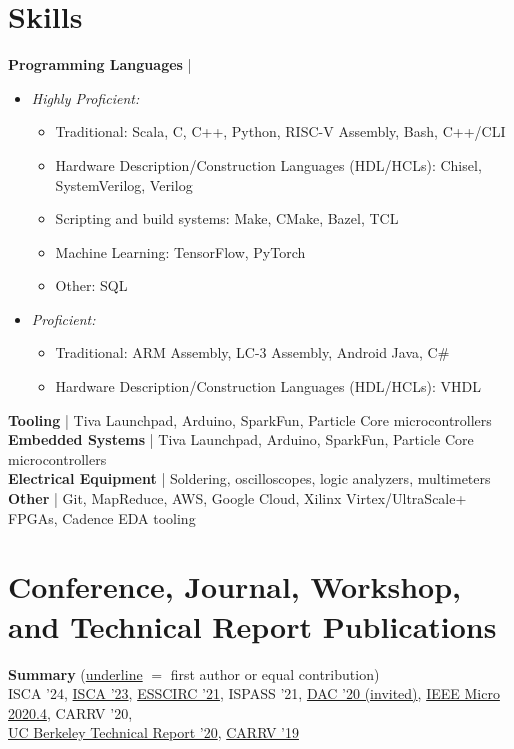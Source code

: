 \documentclass[line]{res}
\begin{document}
\begin{resume}
\pagebreak

\section{\Large{Skills}}
\label{sec:skills}
\vspace{2mm}

\textbf{Programming Languages} |
\begin{itemize}
\item \textit{Highly Proficient:}
\begin{itemize}
\item Traditional: Scala, C, C++, Python, RISC-V Assembly, Bash, C++/CLI
\item Hardware Description/Construction Languages (HDL/HCLs): Chisel, SystemVerilog, Verilog
\item Scripting and build systems: Make, CMake, Bazel, TCL
\item Machine Learning: TensorFlow, PyTorch
\item Other: SQL
\end{itemize}
\item \textit{Proficient:}
\begin{itemize}
\item Traditional: ARM Assembly, LC-3 Assembly, Android Java, C\#
\item Hardware Description/Construction Languages (HDL/HCLs): VHDL
\end{itemize}
\end{itemize}
\vspace{-4mm}
\textbf{Tooling} | Tiva Launchpad, Arduino, SparkFun, Particle Core microcontrollers
\\
\textbf{Embedded Systems} | Tiva Launchpad, Arduino, SparkFun, Particle Core microcontrollers
\\
\textbf{Electrical Equipment} | Soldering, oscilloscopes, logic analyzers, multimeters
\\
\textbf{Other} | Git, MapReduce, AWS, Google Cloud, Xilinx Virtex/UltraScale+ FPGAs, Cadence EDA tooling

\section{\Large{Conference, Journal, Workshop, and Technical Report Publications}}
\label{sec:pubs}
\vspace{2mm}

\textbf{Summary} (\underline{underline} $=$ first author or equal contribution)
\\
ISCA '24, \underline{ISCA '23}, \underline{ESSCIRC '21}, ISPASS '21, \underline{DAC '20 (invited)}, \underline{IEEE Micro 2020.4}, CARRV '20,\\
\underline{UC Berkeley Technical Report '20}, \underline{CARRV '19}
\vspace{-1mm}


\end{resume}
\end{document}
